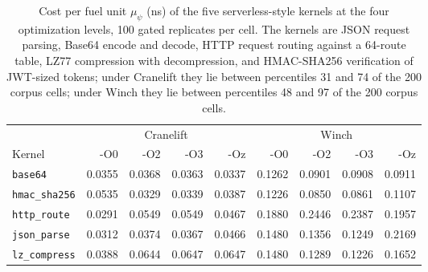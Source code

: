 \begin{table}[t]
\caption{Cost per fuel unit $\mu_\psi$ (ns) of the five serverless-style kernels at the four optimization levels, 100 gated replicates per cell. The kernels are JSON request parsing, Base64 encode and decode, HTTP request routing against a 64-route table, LZ77 compression with decompression, and HMAC-SHA256 verification of JWT-sized tokens; under Cranelift they lie between percentiles 31 and 74 of the 200 corpus cells; under Winch they lie between percentiles 48 and 97 of the 200 corpus cells.}\label{tab:serverless}
\footnotesize
\setlength{\tabcolsep}{4pt}%
\begin{adjustbox}{max width=\textwidth}%
\begin{tabular}{lrrrrrrrr}
\toprule
 & \multicolumn{4}{c}{Cranelift} & \multicolumn{4}{c}{Winch} \\
\cmidrule(lr){2-5}\cmidrule(lr){6-9}
Kernel & -O0 & -O2 & -O3 & -Oz & -O0 & -O2 & -O3 & -Oz \\
\midrule
\texttt{base64} & 0.0355 & 0.0368 & 0.0363 & 0.0337 & 0.1262 & 0.0901 & 0.0908 & 0.0911 \\
\texttt{hmac\_sha256} & 0.0535 & 0.0329 & 0.0339 & 0.0387 & 0.1226 & 0.0850 & 0.0861 & 0.1107 \\
\texttt{http\_route} & 0.0291 & 0.0549 & 0.0549 & 0.0467 & 0.1880 & 0.2446 & 0.2387 & 0.1957 \\
\texttt{json\_parse} & 0.0312 & 0.0374 & 0.0367 & 0.0466 & 0.1480 & 0.1356 & 0.1249 & 0.2169 \\
\texttt{lz\_compress} & 0.0388 & 0.0644 & 0.0647 & 0.0647 & 0.1480 & 0.1289 & 0.1226 & 0.1652 \\
\bottomrule
\end{tabular}%
\end{adjustbox}
\end{table}
